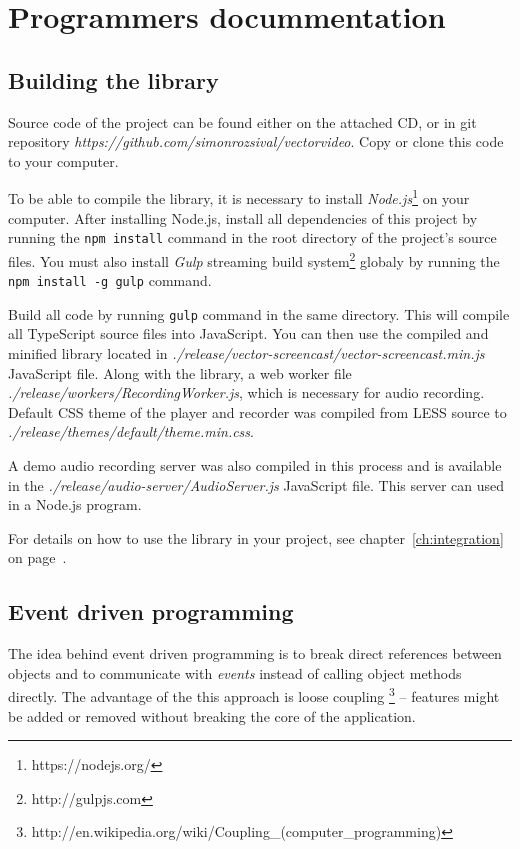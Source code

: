 \chapter{Programmers docummentation}

\section{Building the library}

Source code of the project can be found either on the attached CD, or in git repository \textit{https://github.com/simonrozsival/vectorvideo}. Copy or clone this code to your computer.

To be able to compile the library, it is necessary to install \textit{Node.js}\footnote{https://nodejs.org/} on your computer. After installing Node.js, install all dependencies of this project by running the \verb|npm install| command in the root directory of the project's source files. You must also install \textit{Gulp} streaming build system\footnote{http://gulpjs.com} globaly by running the \verb|npm install -g gulp| command.

Build all code by running \verb|gulp| command in the same directory. This will compile all TypeScript source files into JavaScript. You can then use the compiled and minified library located in \textit{./release/vector-screencast/vector-screencast.min.js} JavaScript file. Along with the library, a web worker file \textit{./release/workers/RecordingWorker.js}, which is necessary for audio recording. Default CSS theme of the player and recorder was compiled from LESS source to \textit{./release/themes/default/theme.min.css}.

A demo audio recording server was also compiled in this process and is available in the \textit{./release/audio-server/AudioServer.js} JavaScript file. This server can used in a Node.js program.

For details on how to use the library in your project, see chapter~\ref{ch:integration} on page~\pageref{ch:integration}.



\section{Event driven programming}
The idea behind event driven programming is to break direct references between objects and to communicate with \textit{events} instead of calling object methods directly. The advantage of the this approach is loose coupling \footnote{http://en.wikipedia.org/wiki/Coupling\_(computer\_programming)} -- features might be added or removed without breaking the core of the application.

